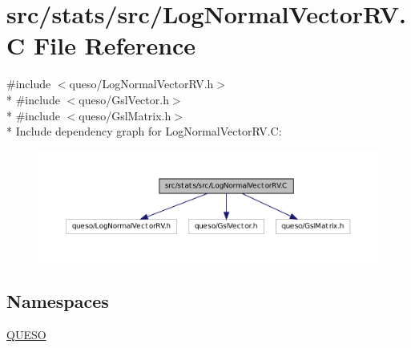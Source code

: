 \hypertarget{_log_normal_vector_r_v_8_c}{\section{src/stats/src/\-Log\-Normal\-Vector\-R\-V.C File Reference}
\label{_log_normal_vector_r_v_8_c}
}
{\ttfamily \#include $<$queso/\-Log\-Normal\-Vector\-R\-V.\-h$>$}\\*
{\ttfamily \#include $<$queso/\-Gsl\-Vector.\-h$>$}\\*
{\ttfamily \#include $<$queso/\-Gsl\-Matrix.\-h$>$}\\*
Include dependency graph for Log\-Normal\-Vector\-R\-V.\-C\-:
\nopagebreak
\begin{figure}[H]
\begin{center}
\leavevmode
\includegraphics[width=350pt]{_log_normal_vector_r_v_8_c__incl}
\end{center}
\end{figure}
\subsection*{Namespaces}
\begin{DoxyCompactItemize}
\item 
\hyperlink{namespace_q_u_e_s_o}{Q\-U\-E\-S\-O}
\end{DoxyCompactItemize}
